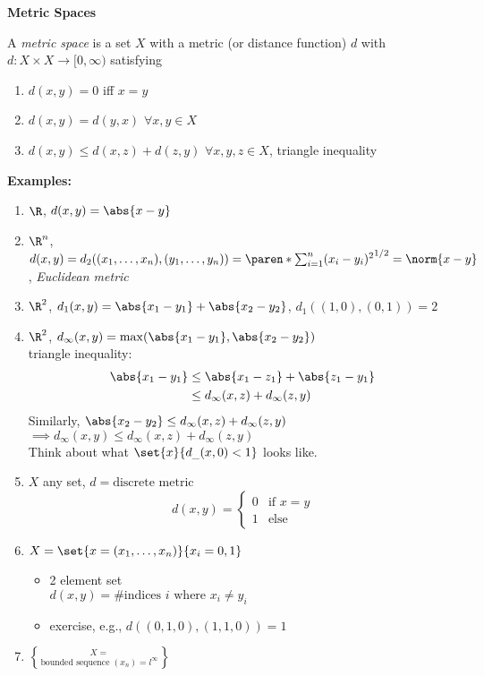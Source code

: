\textbf{Metric Spaces}

 A \emph{metric space} is a set $X$ with a metric (or distance function) $d$ with $d\colon X\times X\to[0,\infty)$ satisfying
\begin{enumerate}
\item $d(x,y)=0$ iff $x=y$
\item $d(x,y)=d(y,x)$ $\forall x,y\in X$
\item $d(x,y)\leq d(x,z)+d(z,y)$ $\forall x,y,z\in X$, triangle inequality
\end{enumerate}
\textbf{Examples:}
\begin{enumerate}
\item $\R$, $d(x,y)=\abs{x-y}$
\item $\R^n$, $d(x,y) = d_2((x_1,\dotsc,x_n),(y_1,\dotsc,y_n)) = \paren*{\sum_{i=1}^n (x_i-y_i)^2}^{1/2} = \norm{x-y}$, \emph{Euclidean metric}
\item $\R^2$, $d_1(x,y)=\abs{x_1-y_1}+\abs{x_2-y_2}$, $d_1((1,0),(0,1))=2$
\item $\R^2$, $d_\infty(x,y)=\max(\abs{x_1-y_1},\abs{x_2-y_2})$ \\
triangle inequality:
\begin{align*}
\abs{x_1-y_1} &\leq \abs{x_1-z_1} + \abs{z_1-y_1} \\
&\leq d_\infty(x,z) + d_\infty(z,y)
\end{align*}
Similarly, $\abs{x_2-y_2}\leq d_\infty(x,z)+d_\infty(z,y)$ \\
$\implies d_\infty(x,y) \leq d_\infty(x,z) + d_\infty(z,y)$ \\
Think about what $\set{x}{d_{\_}(x,0)<1}$ looks like.
%
\item $X$ any set, $d=\text{discrete metric}$
\[ d(x,y) = \begin{cases}
0 & \text{if $x=y$} \\
1 & \text{else}
\end{cases} \]
\item $X=\set{x=(x_1,\dotsc,x_n)}{x_i=0,1}$
\begin{itemize}
\item 2 element set \\
$d(x,y)=\text{\# indices $i$ where $x_i\neq y_i$}$
\item exercise, e.g., $d((0,1,0),(1,1,0))=1$
\end{itemize}
\item $X=\brace{\text{bounded sequence $(x_n)$}}=l^\infty$ \\

\end{enumerate}
